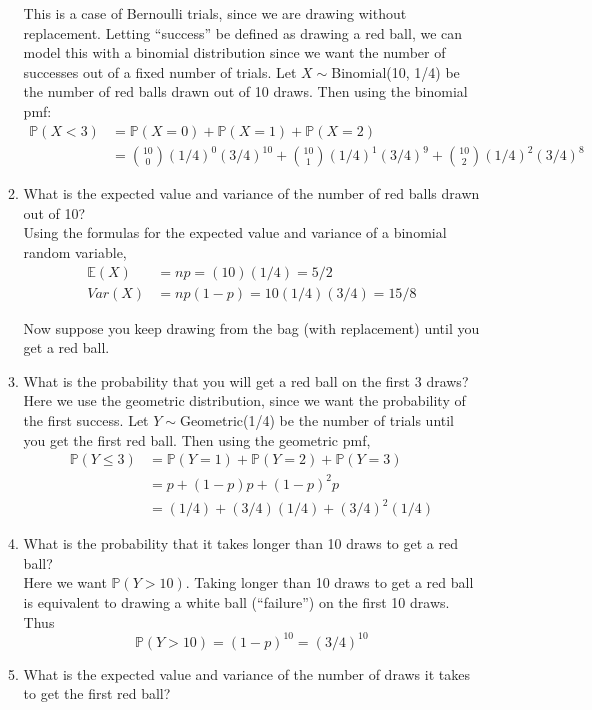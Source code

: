 \documentclass[12pt]{article}
\def\P{{\mathbb P}}
\def\E{{\mathbb E}}
\begin{document}
\begin{enumerate}
\begin{enumerate}
This is a case of Bernoulli trials, since we are drawing without replacement. Letting ``success'' be defined as drawing a red ball, we can model this with a binomial distribution since we want the number of successes out of a fixed number of trials. Let $X \sim $Binomial(10, 1/4) be the number of red balls drawn out of 10 draws. Then using the binomial pmf:
\begin{align*}
\P(X < 3) &= \P(X = 0) + \P(X = 1) + \P(X = 2) \\
&= \binom{10}{0}(1/4)^0(3/4)^{10} + \binom{10}{1}(1/4)^1(3/4)^9 + \binom{10}{2}(1/4)^2(3/4)^8
\end{align*}

\item What is the expected value and variance of the number of red balls drawn out of 10?\\

Using the formulas for the expected value and variance of a binomial random variable,
\begin{align*}
\E(X) &= np = (10)(1/4) = 5/2 \\
Var(X) &= np(1-p) = 10(1/4)(3/4) = 15/8
\end{align*}

Now suppose you keep drawing from the bag (with replacement) until you get a red ball.

\item What is the probability that you will get a red ball on the first 3 draws?\\

Here we use the geometric distribution, since we want the probability of the first success. Let $Y \sim$Geometric(1/4) be the number of trials until you get the first red ball. Then using the geometric pmf,
\begin{align*}
\P(Y \leq 3) &= \P(Y = 1) + \P(Y = 2) + \P(Y = 3) \\
&= p + (1-p)p + (1-p)^2 p \\
&= (1/4) + (3/4)(1/4) + (3/4)^2 (1/4)
\end{align*}

\item What is the probability that it takes longer than 10 draws to get a red ball?\\

Here we want $\P(Y > 10)$. Taking longer than 10 draws to get a red ball is equivalent to drawing a white ball (``failure'') on the first 10 draws. Thus
\[
\P(Y > 10) = (1-p)^{10} = (3/4)^{10}
\]

\item What is the expected value and variance of the number of draws it takes to get the first red ball?\\


\end{enumerate}
\end{enumerate}
\end{document}
